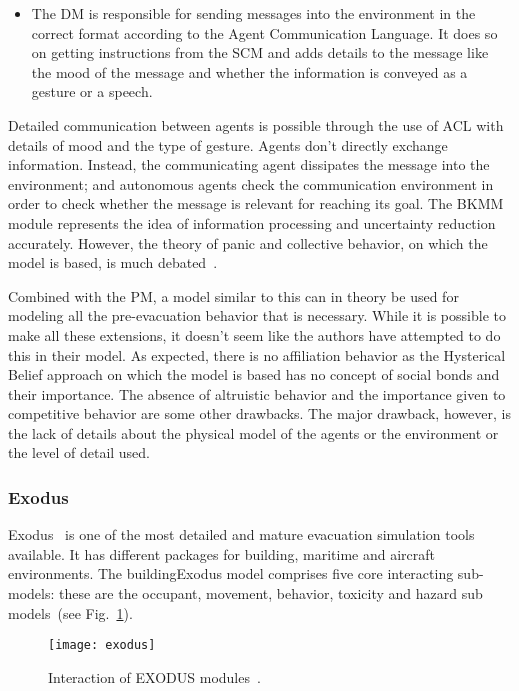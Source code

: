 \begin{itemize}
\item
The DM is responsible for sending messages into the environment in the correct format according to the Agent Communication Language. It does so on getting instructions from the SCM and adds details to the message like the mood of the message and whether the information is conveyed as a gesture or a speech.
\end{itemize}

Detailed communication between agents is possible through the use of ACL with details of mood and the type of gesture. Agents don't directly exchange information. Instead, the communicating agent dissipates the message into the environment; and autonomous agents check the communication environment in order to check whether the message is relevant for reaching its goal. The BKMM module represents the idea of information processing and uncertainty reduction accurately. However, the theory of panic and collective behavior, on which the model is based, is much debated~\cite{Torres:2010tj, Sime:1995uu}.

Combined with the PM, a model similar to this can in theory be used for modeling all the pre-evacuation behavior that is necessary. While it is possible to make all these extensions, it doesn't seem like the authors have attempted to do this in their model. As expected, there is no affiliation behavior as the Hysterical Belief approach on which the model is based has no concept of social bonds and their importance. The absence of altruistic behavior and the importance given to competitive behavior are some other drawbacks. The major drawback, however, is the lack of details about the physical model of the agents or the environment or the level of detail used.

\subsubsection{Exodus}

Exodus~\cite{Owen:1996jh} is one of the most detailed and mature evacuation simulation tools available. It has different packages for building, maritime and aircraft environments. The buildingExodus model comprises five core interacting sub-models: these are the occupant, movement, behavior, toxicity and hazard sub models~(see Fig.~\ref{fig:ExodusDiagram}).

\begin{figure}[!htb]
\centering
\texttt{[image: exodus]}
\caption[EXODUS model]{Interaction of EXODUS modules~\cite{Gwynne:2001te}.}
\label{fig:ExodusDiagram}
\end{figure}


